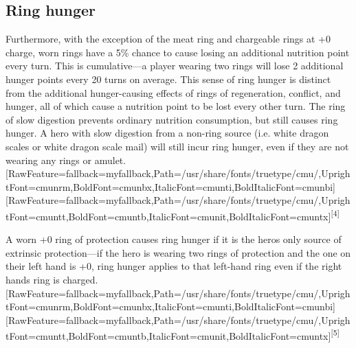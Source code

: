 \subsection{Ring hunger}
\label{3}
Furthermore, with the exception of the meat ring\footnotemark[37] and chargeable rings at +0 charge, worn rings have a 5\% chance to cause losing an additional nutrition point every turn. This is cumulative{\mbox{$\text{---}$}}a player wearing two rings will lose 2 additional hunger points every 20 turns on average. This sense of ring hunger is distinct from the additional hunger-{}causing effects of rings of regeneration\footnotemark[38], conflict\footnotemark[39], and hunger\footnotemark[40], all of which cause a nutrition point to be lost every other turn. The ring of slow digestion\footnotemark[41] prevents ordinary nutrition consumption, but still causes ring hunger. A hero with slow digestion from a non-{}ring source (i.e. white dragon scales\footnotemark[42] or white dragon scale mail\footnotemark[43]) will still incur ring hunger, even if they are not wearing any rings or amulet.\allowbreak{}\setmainfont{cmunrm.ttf}[RawFeature={fallback=myfallback},Path=/usr/share/fonts/truetype/cmu/,UprightFont=cmunrm,BoldFont=cmunbx,ItalicFont=cmunti,BoldItalicFont=cmunbi]\setmonofont{cmunrm.ttf}[RawFeature={fallback=myfallback},Path=/usr/share/fonts/truetype/cmu/,UprightFont=cmuntt,BoldFont=cmuntb,ItalicFont=cmunit,BoldItalicFont=cmuntx]\textsuperscript{{$\text{[}$}4{$\text{]}$}}


A worn +0 ring of protection\footnotemark[44] causes ring hunger if it is the hero\textquotesingle{}s only source of extrinsic protection{\mbox{$\text{---}$}}if the hero is wearing two rings of protection and the one on their left hand is +0, ring hunger applies to that left-{}hand ring even if the right hand\textquotesingle{}s ring is charged.\allowbreak{}\setmainfont{cmunrm.ttf}[RawFeature={fallback=myfallback},Path=/usr/share/fonts/truetype/cmu/,UprightFont=cmunrm,BoldFont=cmunbx,ItalicFont=cmunti,BoldItalicFont=cmunbi]\setmonofont{cmunrm.ttf}[RawFeature={fallback=myfallback},Path=/usr/share/fonts/truetype/cmu/,UprightFont=cmuntt,BoldFont=cmuntb,ItalicFont=cmunit,BoldItalicFont=cmuntx]\textsuperscript{{$\text{[}$}5{$\text{]}$}}


